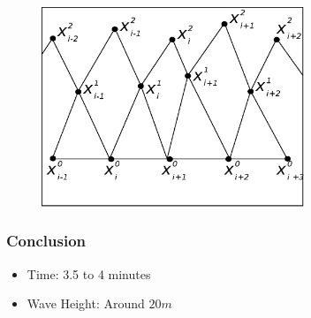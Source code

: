 \documentclass[screen]{beamer}
\begin{document}
\begin{frame}
{\begin{figure}[b]
			\centering
			\includegraphics[width=0.7\textwidth]{fig/charWaveEq3rdStep.eps}
		\end{figure}
	}
\end{frame}


\begin{frame}
	\frametitle{Conclusion}
	\begin{itemize}
		\item Time: 3.5 to 4 minutes 
		\item Wave Height: Around $20m$
	\end{itemize}	
\end{frame}
\end{document}
